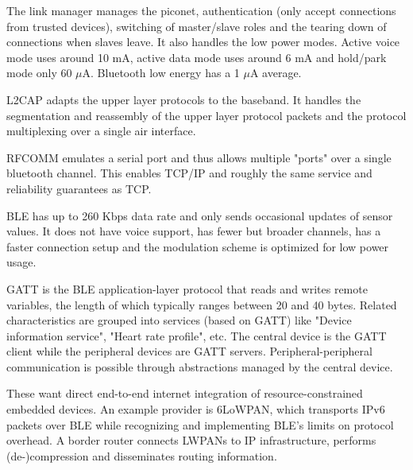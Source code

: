 \begin{mytitle} The link manager manages the piconet, authentication (only accept connections from trusted devices), switching of master/slave roles and the tearing down of connections when slaves leave. It also handles the low power modes. Active voice mode uses around 10 mA, active data mode uses around 6 mA and hold/park mode only 60 $\mu$A. Bluetooth low energy has a 1 $\mu$A average.
\end{mytitle}
\begin{mytitle} L2CAP adapts the upper layer protocols to the baseband. It handles the segmentation and reassembly of the upper layer protocol packets and the protocol multiplexing over a single air interface.
\end{mytitle}
\begin{mytitle}[RFCOMM] RFCOMM emulates a serial port and thus allows multiple "ports" over a single bluetooth channel. This enables TCP/IP and roughly the same service and reliability guarantees as TCP.
\end{mytitle}
\begin{mytitle} BLE has up to 260 Kbps data rate and only sends occasional updates of sensor values. It does not have voice support, has fewer but broader channels, has a faster connection setup and the modulation scheme is optimized for low power usage.
\end{mytitle}
\begin{mytitle} GATT is the BLE application-layer protocol that reads and writes remote variables, the length of which typically ranges between 20 and 40 bytes. Related characteristics are grouped into services (based on GATT) like "Device information service", "Heart rate profile", etc. The central device is the GATT client while the peripheral devices are GATT servers. Peripheral-peripheral communication is possible through abstractions managed by the central device.
\end{mytitle}
\begin{mytitle} These want direct end-to-end internet integration of resource-constrained embedded devices. An example provider is 6LoWPAN, which transports IPv6 packets over BLE while recognizing and implementing BLE's limits on protocol overhead. A border router connects LWPANs to IP infrastructure, performs (de-)compression and disseminates routing information.
\end{mytitle}

